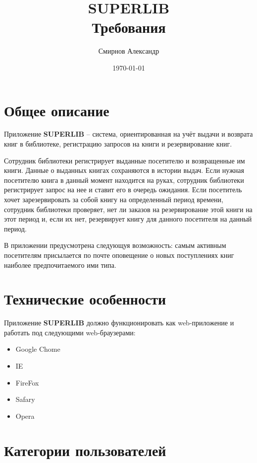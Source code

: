 \documentclass[a4paper,10pt]{article}
\title{\textbf{SUPERLIB} \\
       \large Требования}
\author{ Смирнов Александр }
\date{\today}
\begin{document}
    \maketitle


    \tableofcontents
    \newpage
     

    \section{Общее описание}


        Приложение \textbf{SUPERLIB} -- система, ориентированная на учёт выдачи и возврата книг в библиотеке, регистрацию запросов на книги и резервирование книг. 

        Сотрудник библиотеки регистрирует выданные посетителю и возвращенные им книги. Данные о выданных книгах сохраняются в истории выдач. Если нужная посетителю книга в данный момент находится на руках, сотрудник библиотеки регистрирует запрос на нее и ставит его в очередь ожидания. Если посетитель хочет зарезервировать за собой книгу на определенный период времени, сотрудник библиотеки проверяет, нет ли заказов на резервирование этой книги на этот период и, если их нет, резервирует книгу для данного посетителя на данный период.  

        В приложении предусмотрена следующуя возможность: самым активным посетителям присылается по почте оповещение о новых поступлениях книг наиболее предпочитаемого ими типа.


    \section{Технические особенности}

     
        Приложение \textbf{SUPERLIB} должно функционировать как web-приложение и работать под следующими web-браузерами: 
         
        \begin{itemize}
            \item Google Chome
            \item IE 
            \item FireFox 
            \item Safary 
            \item Opera 
        \end{itemize}
        
     
    \section{Категории пользователей }
\end{document}
